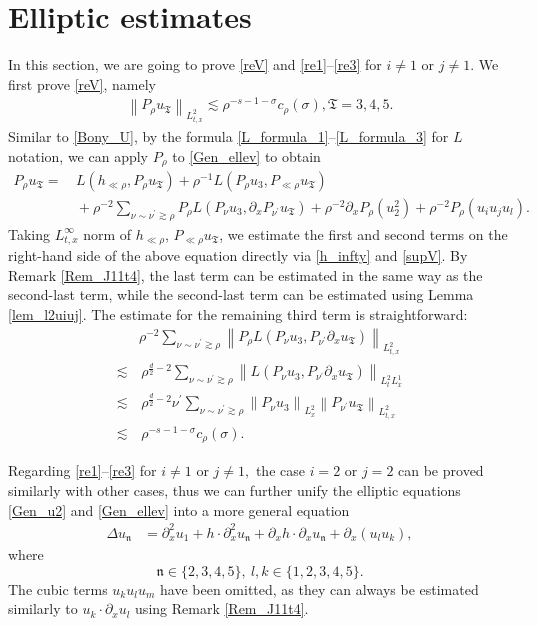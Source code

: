 \documentclass[11pt,letterpaper,reqno]{amsart}
\numberwithin{equation}{section}
\theoremstyle{definition}
\theoremstyle{remark}
\begin{document}
\section{Elliptic estimates}  \label{sec_ell}
In this section, we are going to  prove \eqref{reV} and \eqref{re1}–\eqref{re3} for \( i \neq 1 \) or \( j \neq 1 \).  
We first prove \eqref{reV}, namely 
\begin{align*}
	\left\|P_{\rho}   u_{\mathfrak{T} }\right\|_{L^2_{t,x } }\lesssim  \rho^{-s-1-\sigma} c_\rho(\sigma), \mathfrak{T} =3,4,5.
\end{align*}
 Similar to \eqref{Bony_U}, by the formula \eqref{L_formula_1}--\eqref{L_formula_3} for    $L$ notation,  we can apply \(P_\rho\) to \eqref{Gen_ellev} to obtain
\begin{align*}
		 	P_{\rho}   u_{\mathfrak{T}}
= &\,   L(h_{\ll  \rho}, P_\rho u_{\mathfrak{T}} )+ \rho^{-1} L(P_\rho u_3, P_{\ll \rho } u_{\mathfrak{T}})\nonumber\\
&\,+ \rho^{-2}\sum_{ \nu\sim \nu^\prime \gtrsim \rho}  P_\rho L (P_\nu u_3,  \partial_x P_{\nu^\prime} u_{\mathfrak{T}} )  +\rho^{-2} \partial_x P_\rho (u_2^2)+\rho^{-2}P_\rho(u_i u_j u_l).
\end{align*}
Taking \(L^\infty_{t,x}\) norm of \(h_{\ll  \rho}\), \( P_{\ll \rho } u_{\mathfrak{T}}\), we estimate the first and second terms on the right-hand side of the above equation directly via \eqref{h_infty} and \eqref{supV}. 
By Remark \ref{Rem_J11t4}, the last term can be estimated in the same way as the second-last term, while the second-last term can be estimated using Lemma \ref{lem_l2uiuj}. The estimate for the remaining third term is straightforward:
\begin{align*}
&\rho^{-2}  \sum_{ \nu\sim \nu^\prime \gtrsim \rho} \left\|P_\rho L (P_\nu u_3, P_{\nu^\prime} \partial_x u_{\mathfrak{T}} )\right\|_{L^2_{t,x } }  \\
 \lesssim&\, \rho^{\frac{d}{2}-2}  \sum_{ \nu\sim \nu^\prime \gtrsim \rho} \left\|  L (P_\nu u_3, P_{\nu^\prime} \partial_x u_{\mathfrak{T}} )\right\|_{L^2_{t } L^1_x } \\
 \lesssim &\,  \rho^{\frac{d}{2}-2}  \nu^\prime \sum_{ \nu\sim \nu^\prime \gtrsim \rho} \left\| P_\nu u_3 \right\|_{L^2_{x }  }    \left\| P_{\nu^\prime} u_{\mathfrak{T}}  \right\|_{L^2_{t,x }  }  \\
 \lesssim &\, \rho^{-s-1-\sigma} c_\rho(\sigma).
\end{align*}



Regarding  \eqref{re1}--\eqref{re3} for $ i\neq 1 $ or $ j\neq 1,$  the case   $ i=2 \text{ or } j=2 $  can be proved similarly with other cases, thus we can further unify the elliptic equations \eqref{Gen_u2} and \eqref{Gen_ellev} into a
more   general equation
\begin{align} \label{Gen_ell_e}
	\Delta u_{\mathfrak{n}}
	&=\partial_x^2 u_1+h \cdot \partial_x^2 u_{\mathfrak{n}}+ \partial_x h \cdot \partial_x u_\mathfrak{n}+ \partial_x(u_l   u_k),
\end{align} 
where 
$$ \mathfrak{n}\in \{2,3,4,5\} ,\   l,k\in \{1,2,3,4,5\} . $$ 
The cubic terms \( u_k u_l u_m \) have been omitted, as they can always be estimated similarly to \( u_k \cdot \partial_x u_l \) using Remark \ref{Rem_J11t4}. 
 
\end{document}
